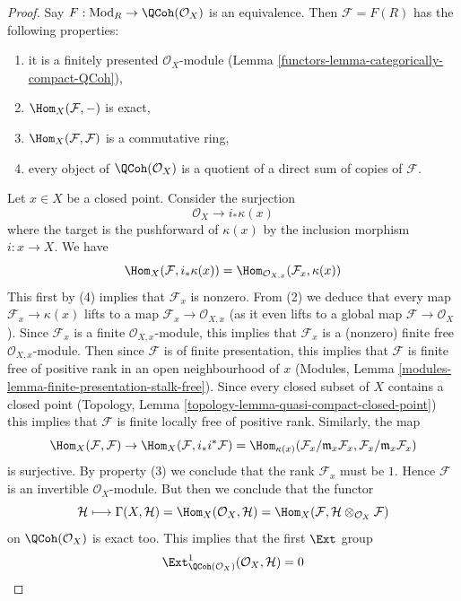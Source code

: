 \begin{proof}

Say $F : \text{Mod}_R \to \QCoh(\mathcal{O}_X)$ is an equivalence.
Then $\mathcal{F} = F(R)$ has the following properties:
\begin{enumerate}
\item it is a finitely presented $\mathcal{O}_X$-module
(Lemma \ref{functors-lemma-categorically-compact-QCoh}),
\item $\Hom_X(\mathcal{F}, -)$ is exact,
\item $\Hom_X(\mathcal{F}, \mathcal{F})$ is a commutative ring,
\item every object of $\QCoh(\mathcal{O}_X)$ is a quotient of
a direct sum of copies of $\mathcal{F}$.
\end{enumerate}
Let $x \in X$ be a closed point. Consider the surjection
$$
\mathcal{O}_X \to i_*\kappa(x)
$$
where the target is the pushforward of $\kappa(x)$ by the
inclusion morphism $i : x \to X$. We have
$$
\Hom_X(\mathcal{F}, i_*\kappa(x)) =
\Hom_{\mathcal{O}_{X, x}}(\mathcal{F}_x, \kappa(x))
$$
This first by (4) implies that $\mathcal{F}_x$ is nonzero.
From (2) we deduce that every map $\mathcal{F}_x \to \kappa(x)$
lifts to a map $\mathcal{F}_x \to \mathcal{O}_{X, x}$ (as it
even lifts to a global map $\mathcal{F} \to \mathcal{O}_X$).
Since $\mathcal{F}_x$ is a finite $\mathcal{O}_{X, x}$-module,
this implies that $\mathcal{F}_x$ is a (nonzero)
finite free $\mathcal{O}_{X, x}$-module.
Then since $\mathcal{F}$ is of finite presentation, this implies
that $\mathcal{F}$ is finite free of positive rank
in an open neighbourhood of $x$
(Modules, Lemma \ref{modules-lemma-finite-presentation-stalk-free}).
Since every closed subset of $X$ contains a closed point
(Topology, Lemma \ref{topology-lemma-quasi-compact-closed-point})
this implies that $\mathcal{F}$ is finite locally free of positive rank.
Similarly, the map
$$
\Hom_X(\mathcal{F}, \mathcal{F}) \to
\Hom_X(\mathcal{F}, i_*i^*\mathcal{F}) =
\Hom_{\kappa(x)}(\mathcal{F}_x/\mathfrak m_x \mathcal{F}_x,
\mathcal{F}_x/\mathfrak m_x \mathcal{F}_x)
$$
is surjective. By property (3) we conclude that the rank $\mathcal{F}_x$
must be $1$. Hence $\mathcal{F}$ is an invertible $\mathcal{O}_X$-module.
But then we conclude that the functor
$$
\mathcal{H}
\longmapsto
\Gamma(X, \mathcal{H}) = \Hom_X(\mathcal{O}_X, \mathcal{H}) =
\Hom_X(\mathcal{F}, \mathcal{H} \otimes_{\mathcal{O}_X} \mathcal{F})
$$
on $\QCoh(\mathcal{O}_X)$ is exact too. This implies that the first
$\Ext$ group
$$
\Ext^1_{\QCoh(\mathcal{O}_X)}(\mathcal{O}_X, \mathcal{H}) = 0
$$
\end{proof}
